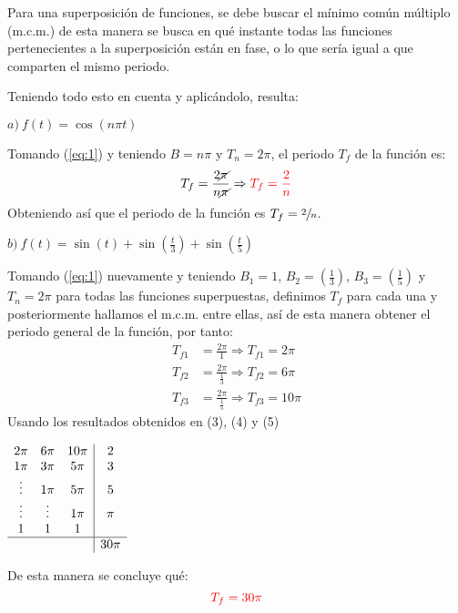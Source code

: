 \begin{multicols}{2}
Para una superposición de funciones, se debe buscar el mínimo común múltiplo (m.c.m.) de esta manera se busca en qué instante todas las funciones pertenecientes a la superposición están en fase, o lo que sería igual a que comparten el mismo periodo.

Teniendo todo esto en cuenta y aplicándolo, resulta:

$a) ~ f(t) = \cos \left(n \pi t\right)$

Tomando (\ref{eq:1}) y teniendo $B = n \pi$ y $T_n = 2\pi$, el periodo $T_f$ de la función es:
\begin{equation}
    T_f = \frac{2 \cancel{\pi}}{n \cancel{\pi}} \Rightarrow \textcolor{rojo}{T_f = \frac{2}{n}}
    \label{res:1}
\end{equation}
Obteniendo así que el periodo de la función es \textcolor{rojo}{$T_f = \sfrac{2}{n}$}.

$b) ~ f(t) = \sin \left(t\right) + \sin \left(\frac{t}{3}\right) + \sin \left(\frac{t}{5}\right)$

Tomando (\ref{eq:1}) nuevamente y teniendo $B_1 = 1$, $B_2 = \left(\frac{1}{3}\right)$, $B_3 = \left(\frac{1}{5}\right)$ y $T_n = 2\pi$ para todas las funciones superpuestas, definimos $T_f$ para cada una y posteriormente hallamos el m.c.m. entre ellas, así de esta manera obtener el periodo general de la función, por tanto:
\begin{align}
    T_{f1} & = \frac{2\pi}{1} \Rightarrow T_{f1} = 2\pi \\
    T_{f2} & = \frac{2\pi}{ \frac{1}{3} } \Rightarrow T_{f2} = 6\pi \\
    T_{f3} & = \frac{2\pi}{ \frac{1}{5} } \Rightarrow T_{f3} = 10\pi
\end{align}
Usando los resultados obtenidos en (3), (4) y (5)
\begin{center}

$\begin{array}{c c c | c}
    2\pi & 6\pi & 10\pi & 2\\
    1\pi & 3\pi & 5\pi & 3\\
    \vdots & 1\pi & 5\pi & 5\\
    \vdots & \vdots & 1\pi & \pi\\
    1 & 1 & 1 & \hphantom{1}\\ \hline
    \hphantom{1\pi} & \hphantom{1\pi} & \hphantom{1\pi} & 30\pi
\end{array}$

\end{center}
De esta manera se concluye qué:
\begin{equation}
    \textcolor{rojo}{T_f = 30\pi}
\label{res:2}
\end{equation}


\end{multicols}
